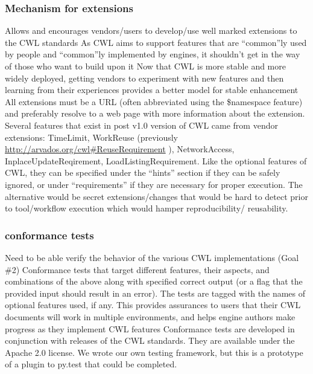 \subsubsection{Mechanism for extensions}
Allows and encourages vendors/users to develop/use well marked extensions to the CWL standards
As CWL aims to support features that are “common”ly used by people and “common”ly implemented by engines, it shouldn’t get in the way of those who want to build upon it
Now that CWL is more stable and more widely deployed, getting vendors to experiment with new features and then learning from their experiences provides a better model for stable enhancement
All extensions must be a URL (often abbreviated using the \$namespace feature) and preferably resolve to a web page with more information about the extension. Several features that exist in post v1.0 version of CWL came from vendor extensions: TimeLimit, WorkReuse (previously \url{http://arvados.org/cwl#ReuseRequirement} ), NetworkAccess, InplaceUpdateReqirement, LoadListingRequirement. Like the optional features of CWL, they can be specified under the “hints” section if they can be safely ignored, or under “requirements” if they are necessary for proper execution.
The alternative would be secret extensions/changes that would be hard to detect prior to tool/workflow execution which would hamper reproducibility/ reusability.
\subsubsection{conformance tests}
Need to be able verify the behavior of the various CWL implementations (Goal \#2)
Conformance tests that target different features, their aspects, and combinations of the above along with specified correct output (or a flag that the provided input should result in an error). The tests are tagged with the names of optional features used, if any.
This provides assurances to users that their CWL documents will work in multiple environments, and helps engine authors make progress as they implement CWL features
Conformance tests are developed in conjunction with releases of the CWL standards. They are available under the Apache 2.0 license.
We wrote our own testing framework, but this is a prototype of a plugin to py.test that could be completed.
